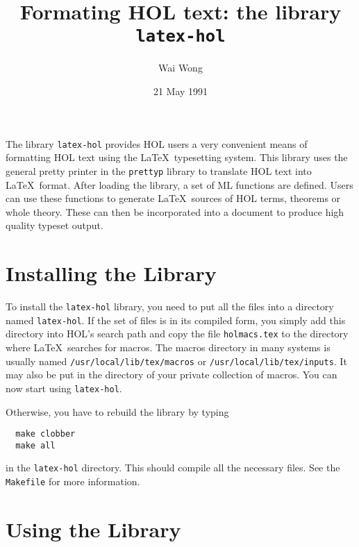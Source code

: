 
\title{Formating HOL text: the library {\tt latex-hol}}
\author{Wai Wong}
\date{21 May 1991}




\maketitle
  
The library {\tt latex-hol} provides HOL users a very convenient means of
formatting HOL text using the \LaTeX\ typesetting system. This library
uses the general pretty printer in the {\tt prettyp} library to
translate HOL text into \LaTeX\ format. After loading the library, a
set of ML functions are defined. Users can use these functions to
generate \LaTeX\ sources of HOL terms, theorems or whole theory. These
can then be incorporated into a document to produce high quality
typeset output.  

\section{Installing the Library}

To install the {\tt latex-hol} library, you need to put all the files
into a directory named {\tt latex-hol}. If the set of files is in its
compiled form, you simply add this directory into HOL's search path
and copy the file {\tt holmacs.tex} to the directory where \LaTeX\
searches for macros. The macros directory in many systems is usually named
{\tt /usr/local/lib/tex/macros} or {\tt /usr/local/lib/tex/inputs}. It
may also be put in the directory of
your private collection of macros. You can now start using {\tt latex-hol}.

 Otherwise, you have to rebuild the library by typing 
\begin{verbatim}
  make clobber
  make all
\end{verbatim}
in the {\tt latex-hol} directory. This should compile all the
necessary files. See the {\tt Makefile} for more information.

\section{Using the Library}

